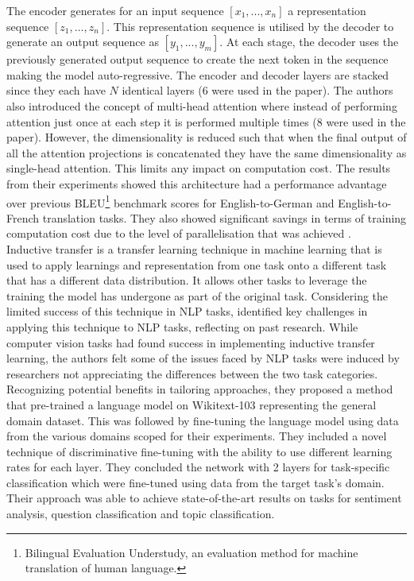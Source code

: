 The encoder generates for an input sequence $[x_1, ..., x_n]$ a representation sequence $[z_1, ..., z_n]$. This representation sequence is utilised by the decoder to generate an output sequence as $[y_1, ..., y_m]$. At each stage, the decoder uses the previously generated output sequence to create the next token in the sequence making the model auto-regressive. The encoder and decoder layers are stacked since they each have $N$ identical layers (6 were used in the paper). The authors also introduced the concept of multi-head attention where instead of performing attention just once at each step it is performed multiple times (8 were used in the paper). However, the dimensionality is reduced such that when the final output of all the attention projections is concatenated they have the same dimensionality as single-head attention. This limits any impact on computation cost. The results from their experiments showed this architecture had a performance advantage over previous BLEU\footnote{Bilingual Evaluation Understudy, an evaluation method for machine translation of human language.} benchmark scores for English-to-German and English-to-French translation tasks. They also showed significant savings in terms of training computation cost due to the level of parallelisation that was achieved \cite{vaswaniAttentionAllYou2023a}. \\

Inductive transfer is a transfer learning technique in machine learning that is used to apply learnings and representation from one task onto a different task that has a different data distribution. It allows other tasks to leverage the training the model has undergone as part of the original task. Considering the limited success of this technique in NLP tasks, \cite{howardUniversalLanguageModel2018} identified key challenges in applying this technique to NLP tasks, reflecting on past research.  While computer vision tasks had found success in implementing inductive transfer learning, the authors felt some of the issues faced by NLP tasks were induced by researchers not appreciating the differences between the two task categories. Recognizing potential benefits in tailoring approaches, they proposed a method that pre-trained a language model on Wikitext-103 \cite{merityPointerSentinelMixture2016} representing the general domain dataset. This was followed by fine-tuning the language model using data from the various domains scoped for their experiments. They included a novel technique of
discriminative fine-tuning with the ability to use different learning rates for each layer. They concluded the network with 2 layers for task-specific classification which were fine-tuned using data from the target task's domain. Their approach was able to achieve state-of-the-art results on tasks for sentiment analysis, question classification and topic classification.\\

